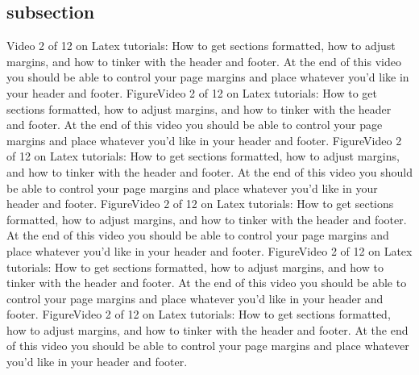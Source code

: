 \documentclass[12pt]{report}
\begin{document}
	\subsection*{subsection}
	Video 2 of 12 on Latex tutorials: How to get sections formatted, how to adjust margins, and how to tinker with the header and footer. At the end of this video you should be able to control your page margins and place whatever you'd like in your header and footer. FigureVideo 2 of 12 on Latex tutorials: How to get sections formatted, how to adjust margins, and how to tinker with the header and footer. At the end of this video you should be able to control your page margins and place whatever you'd like in your header and footer. FigureVideo 2 of 12 on Latex tutorials: How to get sections formatted, how to adjust margins, and how to tinker with the header and footer. At the end of this video you should be able to control your page margins and place whatever you'd like in your header and footer. FigureVideo 2 of 12 on Latex tutorials: How to get sections formatted, how to adjust margins, and how to tinker with the header and footer. At the end of this video you should be able to control your page margins and place whatever you'd like in your header and footer. FigureVideo 2 of 12 on Latex tutorials: How to get sections formatted, how to adjust margins, and how to tinker with the header and footer. At the end of this video you should be able to control your page margins and place whatever you'd like in your header and footer. FigureVideo 2 of 12 on Latex tutorials: How to get sections formatted, how to adjust margins, and how to tinker with the header and footer. At the end of this video you should be able to control your page margins and place whatever you'd like in your header and footer.
	
	
\end{document}
